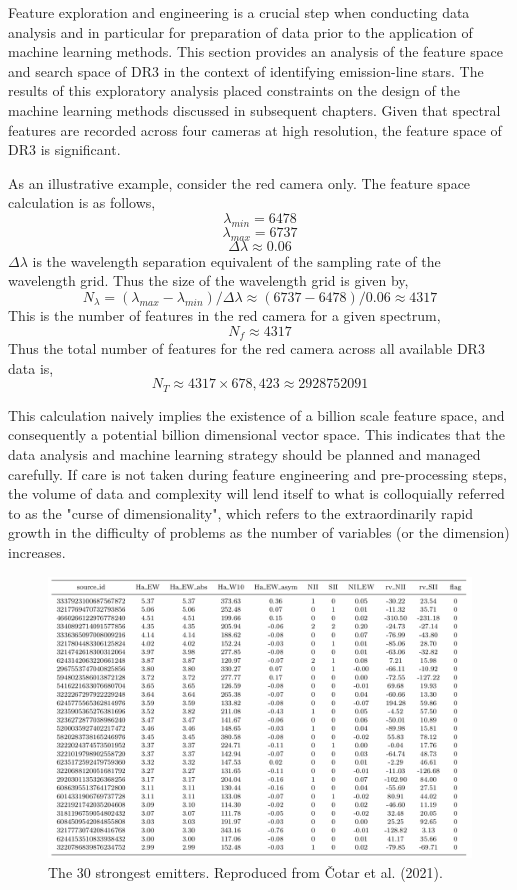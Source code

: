 Feature exploration and engineering is a crucial step when conducting data analysis and in particular for preparation of data prior to the application of machine learning methods. This section provides an analysis of the feature space and search space of DR3 in the context of identifying emission-line stars. The results of this exploratory analysis placed constraints on the design of the machine learning methods discussed in subsequent chapters. Given that spectral features are recorded across four cameras at high resolution, the feature space of DR3 is significant. 

As an illustrative example, consider the red camera only. The feature space calculation is as follows,
\[\lambda_{min} = 6478\]
\[\lambda_{max} = 6737\]
\[\Delta\lambda \approx 0.06\]
$\Delta\lambda$ is the wavelength separation equivalent of the sampling rate of the wavelength grid. Thus the size of the wavelength grid is given by, \[N_{\lambda} = (\lambda_{max}-\lambda_{min})/\Delta\lambda \approx (6737-6478)/0.06 \approx 4317\]
This is the number of features in the red camera for a given spectrum, \[N_{f} \approx 4317\]
Thus the total number of features for the red camera across all available DR3 data is, \[N_{T} \approx 4317\times678,423 \approx \num[round-precision=2,round-mode=figures,
     scientific-notation=true]{2928752091}\]

This calculation naively implies the existence of a billion scale feature space, and consequently a potential billion dimensional vector space. This indicates that the data analysis and machine learning strategy should be planned and managed carefully. If care is not taken during feature engineering and pre-processing steps, the volume of data and complexity will lend itself to what is colloquially referred to as the "curse of dimensionality", which refers to the extraordinarily rapid growth in the difficulty of problems as the number of variables (or the dimension) increases\cite{kuo2005lifting}.

\begin{figure}[!htb]
\centering
\includegraphics[scale=.45]{figures/cotartable.png}
\caption{The 30 strongest emitters. Reproduced from Čotar et al. (2021)\cite{vcotar2021galah}.}
\end{figure}

